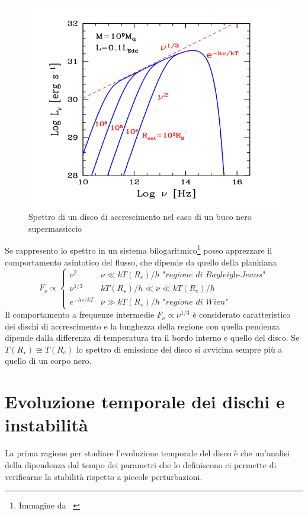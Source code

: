\documentclass[a4paperbi]{article}
\begin{document}
	\begin{figure}[H]
		\centering
		\includegraphics[width=0.7\linewidth]{SpettroDiscoGhisellini}
		\caption{Spettro di un disco di accrescimento nel caso di un buco nero supermassiccio}
		\label{fig:SpettroDiscoGhisellini}
	\end{figure}	

	Se rappresento lo spettro in un sistema bilogaritmico\footnote{Immagine da ~\cite{GhiselliniRadiativi}} posso apprezzare il comportamento asintotico del flusso, che dipende da quello della plankiana
	\begin{equation}
		F_\nu\propto\begin{cases}
						\nu^2 & \nu\ll kT(R_{e})/h \textit{ "regione di Rayleigh-Jeans"}\\
						\nu^{1/3} & kT(R_{\star})/h\ll\nu\ll kT(R_{e})/h\\
						e^{-h\nu/kT} & \nu\gg kT(R_{\star})/h \textit{ "regione di Wien"}						
					\end{cases}
	\end{equation}
	Il comportamento a frequenze intermedie $F_\nu\propto\nu^{1/3}$ è considerato caratteristico dei dischi di accrescimento e la lunghezza della regione con quella pendenza dipende dalla differenza di temperatura tra il bordo interno e quello del disco. Se $T(R_{\star})\cong T(R_{e})$ lo spettro di emissione del disco si avvicina sempre più a quello di un corpo nero.
		
\newpage
\section{Evoluzione temporale dei dischi e instabilità}
	La prima ragione per studiare l'evoluzione temporale del disco è che un'analisi della dipendenza dal tempo dei parametri che lo definiscono ci permette di verificarne la stabilità rispetto a piccole perturbazioni. 
	
\end{document}
